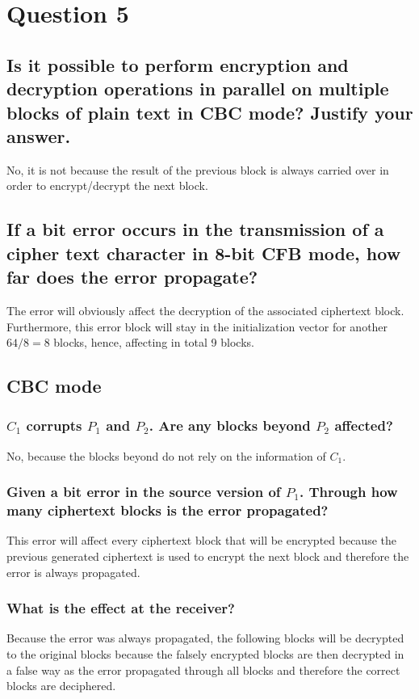 \documentclass{report}
\begin{document}
	\section{Question 5}
	\startsection
		\renewcommand{\thesubsection}{\thesection.\Alph{subsection}}
		\subsection{Is it possible to perform encryption and decryption operations in parallel on multiple blocks of plain text in CBC mode? Justify your answer.}
		\startsubsection
			No, it is not because the result of the previous block is always carried over in order to encrypt/decrypt the next block.
		\closesection
		\subsection{If a bit error occurs in the transmission of a cipher text character in 8-bit CFB mode, how far does the error propagate?}
		\startsubsection
			The error will obviously affect the decryption of the associated ciphertext block. Furthermore, this error block will stay in the initialization vector for another $64/8 = 8$ blocks, hence, affecting in total 9 blocks.
		\closesection
		\subsection{CBC mode}
		\startsubsection
			\subsubsection{$C_1$ corrupts $P_1$ and $P_2$. Are any blocks beyond $P_2$ affected?}
			\startsubsection
				No, because the blocks beyond do not rely on the information of  $C_1$.
			\closesection
			\subsubsection{Given a bit error in the source version of $P_1$. Through how many ciphertext blocks is the error propagated?}
			\startsubsection
				This error will affect every ciphertext block that will be encrypted because the previous generated ciphertext is used to encrypt the next block and therefore the error is always propagated.
			\closesection
			\subsubsection{What is the effect at the receiver?}
			\startsubsection
				Because the error was always propagated, the following blocks will be decrypted to the original blocks because the falsely encrypted blocks are then decrypted in a false way as the error propagated through all blocks and therefore the correct blocks are deciphered.
			\closesection
		\closesection
	\closesection
\end{document}
